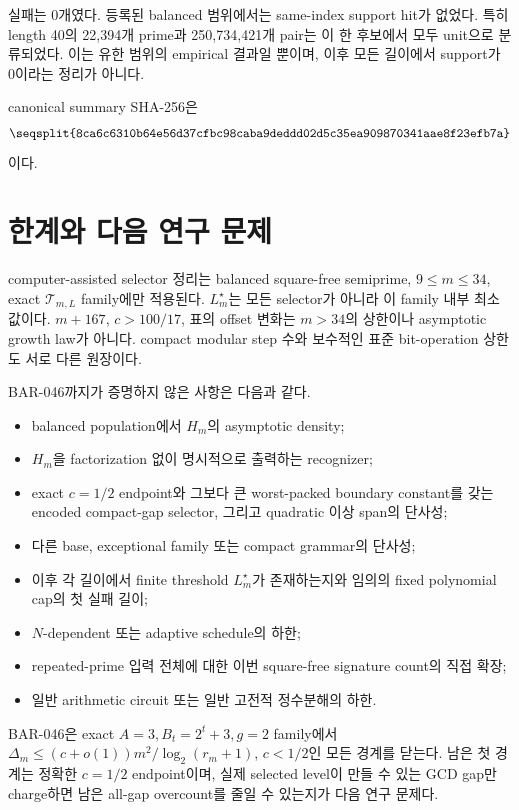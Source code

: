 \documentclass[11pt]{article}
\begin{document}
실패는 0개였다. 등록된 balanced 범위에서는 same-index support hit가
없었다. 특히 length 40의 22,394개 prime과 250,734,421개 pair는 이
한 후보에서 모두 unit으로 분류되었다. 이는 유한 범위의 empirical
결과일 뿐이며, 이후 모든 길이에서 support가 0이라는 정리가 아니다.

canonical summary SHA-256은
\[
\texttt{\seqsplit{8ca6c6310b64e56d37cfbc98caba9deddd02d5c35ea909870341aae8f23efb7a}}
\]
이다.

\section{한계와 다음 연구 문제}

computer-assisted selector 정리는 balanced square-free semiprime,
\(9\le m\le34\), exact \(\mathcal T_{m,L}\) family에만 적용된다.
\(L_m^\star\)는 모든 selector가 아니라 이 family 내부 최소값이다.
\(m+167\), \(c>100/17\), 표의 offset 변화는 \(m>34\)의 상한이나
asymptotic growth law가 아니다. compact modular step 수와 보수적인
표준 bit-operation 상한도 서로 다른 원장이다.

BAR-046까지가 증명하지 않은 사항은 다음과 같다.

\begin{itemize}
\item balanced population에서 \(H_m\)의 asymptotic density;
\item \(H_m\)을 factorization 없이 명시적으로 출력하는 recognizer;
\item exact \(c=1/2\) endpoint와 그보다 큰 worst-packed boundary constant를 갖는
  encoded compact-gap selector, 그리고 quadratic 이상 span의 단사성;
\item 다른 base, exceptional family 또는 compact grammar의 단사성;
\item 이후 각 길이에서 finite threshold \(L_m^\star\)가 존재하는지와
  임의의 fixed polynomial cap의 첫 실패 길이;
\item \(N\)-dependent 또는 adaptive schedule의 하한;
\item repeated-prime 입력 전체에 대한 이번 square-free signature
  count의 직접 확장;
\item 일반 arithmetic circuit 또는 일반 고전적 정수분해의 하한.
\end{itemize}

BAR-046은 exact \(A=3,B_t=2^t+3,g=2\) family에서
\(\Delta_m\le(c+o(1))m^2/\log_2(r_m+1)\), \(c<1/2\)인 모든
경계를 닫는다. 남은 첫 경계는 정확한 \(c=1/2\) endpoint이며,
실제 selected level이 만들 수 있는 GCD gap만 charge하면 남은
all-gap overcount를 줄일 수 있는지가 다음 연구 문제다.
\end{document}
